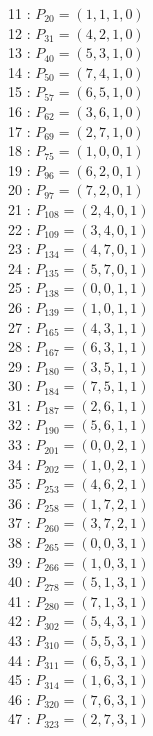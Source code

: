 \documentclass{article}
\begin{document}
{\begin{multicols}{3}
11 : $P_{20}=( 1, 1, 1, 0 )$\\
12 : $P_{31}=( 4, 2, 1, 0 )$\\
13 : $P_{40}=( 5, 3, 1, 0 )$\\
14 : $P_{50}=( 7, 4, 1, 0 )$\\
15 : $P_{57}=( 6, 5, 1, 0 )$\\
16 : $P_{62}=( 3, 6, 1, 0 )$\\
17 : $P_{69}=( 2, 7, 1, 0 )$\\
18 : $P_{75}=( 1, 0, 0, 1 )$\\
19 : $P_{96}=( 6, 2, 0, 1 )$\\
20 : $P_{97}=( 7, 2, 0, 1 )$\\
21 : $P_{108}=( 2, 4, 0, 1 )$\\
22 : $P_{109}=( 3, 4, 0, 1 )$\\
23 : $P_{134}=( 4, 7, 0, 1 )$\\
24 : $P_{135}=( 5, 7, 0, 1 )$\\
25 : $P_{138}=( 0, 0, 1, 1 )$\\
26 : $P_{139}=( 1, 0, 1, 1 )$\\
27 : $P_{165}=( 4, 3, 1, 1 )$\\
28 : $P_{167}=( 6, 3, 1, 1 )$\\
29 : $P_{180}=( 3, 5, 1, 1 )$\\
30 : $P_{184}=( 7, 5, 1, 1 )$\\
31 : $P_{187}=( 2, 6, 1, 1 )$\\
32 : $P_{190}=( 5, 6, 1, 1 )$\\
33 : $P_{201}=( 0, 0, 2, 1 )$\\
34 : $P_{202}=( 1, 0, 2, 1 )$\\
35 : $P_{253}=( 4, 6, 2, 1 )$\\
36 : $P_{258}=( 1, 7, 2, 1 )$\\
37 : $P_{260}=( 3, 7, 2, 1 )$\\
38 : $P_{265}=( 0, 0, 3, 1 )$\\
39 : $P_{266}=( 1, 0, 3, 1 )$\\
40 : $P_{278}=( 5, 1, 3, 1 )$\\
41 : $P_{280}=( 7, 1, 3, 1 )$\\
42 : $P_{302}=( 5, 4, 3, 1 )$\\
43 : $P_{310}=( 5, 5, 3, 1 )$\\
44 : $P_{311}=( 6, 5, 3, 1 )$\\
45 : $P_{314}=( 1, 6, 3, 1 )$\\
46 : $P_{320}=( 7, 6, 3, 1 )$\\
47 : $P_{323}=( 2, 7, 3, 1 )$\\

\end{multicols}}
\end{document}
